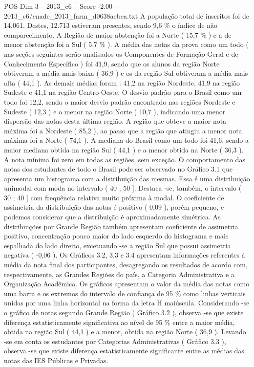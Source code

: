 \begin{textsample}{POS Dim 3 – 2013\_c6 – Score -2.00 – 2013\_c6/enade\_2013\_farm\_d0638aebea.txt}
A população total de inscritos foi de 14.061.
Destes, 12.713 estiveram presentes, sendo 9,6 \% o índice de não comparecimento.
A Região de maior abstenção foi a Norte ( 15,7 \% ) e a de menor abstenção foi a Sul ( 5,7 \% ).
A média das notas da prova como um todo ( nas seções seguintes serão analisados os Componentes de Formação Geral e de Conhecimento Específico ) foi 41,9, sendo que os alunos da região Norte obtiveram a média mais baixa ( 36,9 ) e os da região Sul obtiveram a média mais alta ( 44,1 ).
As demais médias foram : 41,2 na região Nordeste, 41,9 na região Sudeste e 41,1 na região Centro-Oeste.
O desvio padrão para o Brasil como um todo foi 12,2, sendo o maior desvio padrão encontrado nas regiões Nordeste e Sudeste ( 12,3 ) e o menor na região Norte ( 10,7 ), indicando uma menor dispersão das notas desta última região.
A região que obteve a maior nota máxima foi a Nordeste ( 85,2 ), ao passo que a região que atingiu a menor nota máxima foi a Norte ( 74,1 ).
A mediana do Brasil como um todo foi 41,6, sendo a maior mediana obtida na região Sul ( 44,1 ) e a menor obtida na Norte ( 36,3 ).
A nota mínima foi zero em todas as regiões, sem exceção.
O comportamento das notas dos estudantes de todo o Brasil pode ser observado no Gráfico 3.1 que apresenta um histograma com a distribuição das mesmas.
Essa é uma distribuição unimodal com moda no intervalo ( 40 ; 50 ].
Destaca -se, também, o intervalo ( 30 ; 40 ] com frequência relativa muito próxima à modal.
O coeficiente de assimetria da distribuição das notas é positivo ( 0,09 ), porém pequeno, e podemos considerar que a distribuição é aproximadamente simétrica.
As distribuições por Grande Região também apresentam coeficiente de assimetria positivo, concentração pouco maior do lado esquerdo do histograma e mais espalhada do lado direito, excetuando -se a região Sul que possui assimetria negativa ( -0,06 ).
Os Gráficos 3.2, 3.3 e 3.4 apresentam informações referentes à média da nota final dos participantes, desagregando os resultados de acordo com, respectivamente, as Grandes Regiões do país, a Categoria Administrativa e a Organização Acadêmica.
Os gráficos apresentam o valor da média das notas como uma barra e os extremos do intervalo de confiança de 95 \% como linhas verticais unidas por uma linha horizontal na forma da letra H maiúscula.
Considerando -se o gráfico de notas segundo Grande Região ( Gráfico 3.2 ), observa -se que existe diferença estatisticamente significativa ao nível de 95 \% entre a maior média, obtida na região Sul ( 44,1 ) e a menor, obtida na região Norte ( 36,9 ).
Levando -se em conta os estudantes por Categorias Administrativas ( Gráfico 3.3 ), observa -se que existe diferença estatisticamente significante entre as médias das notas das IES Públicas e Privadas.

\end{textsample}
